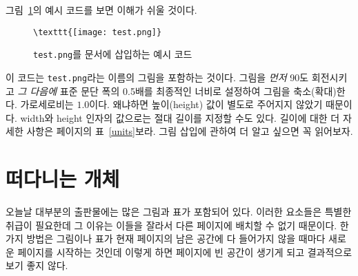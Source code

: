 그림~\ref{figureex}의 예시 코드를 보면 이해가 쉬울 것이다.
\begin{figure}[!htb]
\begin{lined}{10cm}
\begin{verbatim}
\texttt{[image: test.png]}
\end{verbatim}
\end{lined}
\caption{\texttt{test.png}를 문서에 삽입하는 예시 코드\label{figureex}}
\end{figure}
이 코드는 \texttt{test.png}라는 이름의 그림을 포함하는 것이다.
그림을 \emph{먼저} 90도 회전시키고 \emph{그 다음에} 표준 문단 폭의 0.5배를 최종적인 너비로
설정하여 그림을 축소(확대)한다. 가로세로비는 $1.0$이다. 왜냐하면 높이(height) 값이 별도로 주어지지 않았기 때문이다.
width와 height 인자의 값으로는 절대 길이를 지정할 수도 있다. 길이에 대한 더 자세한 사항은 
\pageref{units}페이지의 표~\ref{units}\를 보라. 
그림 삽입에 관하여 더 알고 싶으면 \cite{graphics}\를 꼭 읽어보자.

\section{떠다니는 개체} \label{floats}
오늘날 대부분의 출판물에는 많은 그림과 표가 포함되어 있다. 이러한 요소들은 특별한 취급이 필요한데
그 이유는 이들을 잘라서 다른 페이지에 배치할 수 없기 때문이다.
한 가지 방법은 그림이나 표가 현재 페이지의 남은 공간에 다 들어가지 않을 때마다 새로운 페이지를 시작하는 것인데 
이렇게 하면 페이지에 빈 공간이 생기게 되고 결과적으로 보기 좋지 않다.

